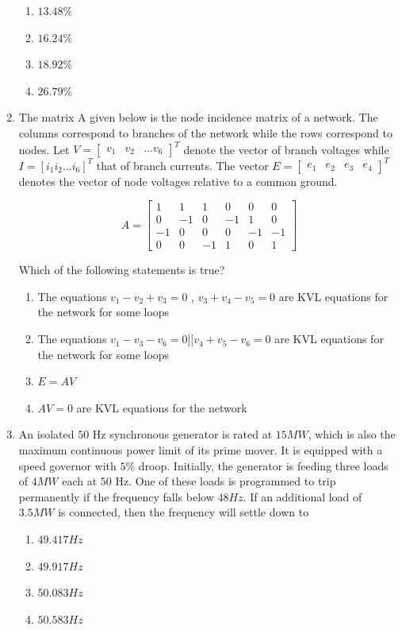 \documentclass[journal,12pt,onecolumn]{IEEEtran}
\theoremstyle{remark}
\begin{document}
\begin{enumerate}
\begin{enumerate}
\item $13.48\%$
\item $16.24\%$
\item $18.92\%$
\item $26.79\%$
\end{enumerate}

\item The matrix A given below is the node incidence matrix of a network. The columns correspond to branches of the network while the rows correspond to nodes. Let $V=[\begin{matrix}v_{1}&v_{2}&...v_{6}\end{matrix}]^{T}$ denote the vector of branch voltages while $I=[i_{1}i_{2}...i_{6}]^{T}$ that of branch currents. The vector $E=[\begin{matrix}e_{1}&e_{2}&e_{3}&e_{4}\end{matrix}]^{T}$ denotes the vector of node voltages relative to a common ground.   

\[
A = \begin{bmatrix}
1 & 1 & 1 & 0 & 0 & 0 \\
0 & -1 & 0 & -1 & 1 & 0 \\
-1 & 0 & 0 & 0 & -1 & -1 \\
0 & 0 & -1 & 1 & 0 & 1
\end{bmatrix}
\]

Which of the following statements is true?

\begin{enumerate}
\item The equations $v_{1}-v_{2}+v_{3}=0$ , $v_{3}+v_{4}-v_{5}=0$ are KVL equations for the network for some loops
\item The equations $v_{1}-v_{3}-v_{6}=0] [v_{4}+v_{5}-v_{6}=0$ are KVL equations for the network for some loops
\item $E=AV$
\item $AV=0$ are KVL equations for the network
\end{enumerate}

\item An isolated $50$ Hz synchronous generator is rated at $15 MW$, which is also the maximum continuous power limit of its prime mover. It is equipped with a speed governor with $5\%$ droop. Initially, the generator is feeding three loads of $4 MW$ each at $50$ Hz. One of these loads is programmed to trip permanently if the frequency falls below $48 Hz$. If an additional load of $3.5 MW$ is connected, then the frequency will settle down to   
\begin{enumerate}
\item $49.417 Hz$
\item $49.917 Hz$
\item $50.083 Hz$
\item $50.583 Hz$
\end{enumerate}
\end{enumerate} 
\end{document}
